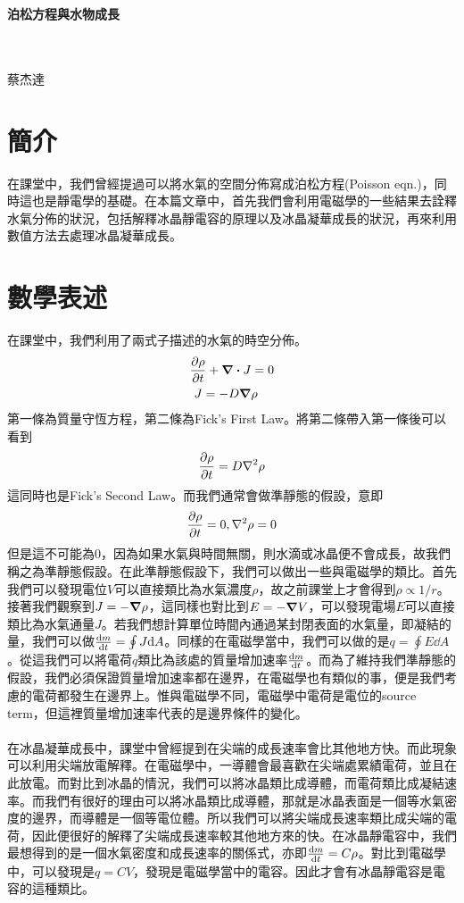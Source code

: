 \documentclass[12pt, a4paper]{article}
\theoremstyle{mystyle}	%
\begin{document}
\renewcommand{\headrulewidth}{0.4pt}
\begin{center}
\begin{Large}
\textbf{泊松方程與水物成長}
\end{Large}
~\\
~\\
蔡杰達
\end{center}
\section{簡介}
在課堂中，我們曾經提過可以將水氣的空間分佈寫成泊松方程(Poisson eqn.)，同時這也是靜電學的基礎。在本篇文章中，首先我們會利用電磁學的一些結果去詮釋水氣分佈的狀況，包括解釋冰晶靜電容的原理以及冰晶凝華成長的狀況，再來利用數值方法去處理冰晶凝華成長。

\section{數學表述}
在課堂中，我們利用了兩式子描述的水氣的時空分佈。
\begin{align}
    \pdv{\rho}{t} + \div{J} &= 0 \\
    J = -D\gradient{&\rho}
\end{align}
第一條為質量守恆方程，第二條為Fick's First Law。將第二條帶入第一條後可以看到
\begin{equation}
    \pdv{\rho}{t} = D\laplacian{\rho}
\end{equation}
這同時也是Fick's Second Law。而我們通常會做準靜態的假設，意即
\begin{equation}
    \pdv{\rho}{t} = 0, \laplacian \rho = 0
\end{equation}
但是這不可能為0，因為如果水氣與時間無關，則水滴或冰晶便不會成長，故我們稱之為準靜態假設。在此準靜態假設下，我們可以做出一些與電磁學的類比。首先我們可以發現電位\(V\)可以直接類比為水氣濃度\(\rho\)，故之前課堂上才會得到\(\rho \propto 1/r\)。接著我們觀察到\(J = -\grad{\rho}\)，這同樣也對比到\(E = -\grad{V}\)，可以發現電場\(E\)可以直接類比為水氣通量\(J\)。若我們想計算單位時間內通過某封閉表面的水氣量，即凝結的量，我們可以做\( \dv{m}{t} = \oint J \dd A\)。同樣的在電磁學當中，我們可以做的是\(q = \oint E \dd A\)。從這我們可以將電荷\(q\)類比為該處的質量增加速率\(\dv{m}{t}\)。而為了維持我們準靜態的假設，我們必須保證質量增加速率都在邊界，在電磁學也有類似的事，便是我們考慮的電荷都發生在邊界上。惟與電磁學不同，電磁學中電荷是電位的source term，但這裡質量增加速率代表的是邊界條件的變化。\\
\\
在冰晶凝華成長中，課堂中曾經提到在尖端的成長速率會比其他地方快。而此現象可以利用尖端放電解釋。在電磁學中，一導體會最喜歡在尖端處累績電荷，並且在此放電。而對比到冰晶的情況，我們可以將冰晶類比成導體，而電荷類比成凝結速率。而我們有很好的理由可以將冰晶類比成導體，那就是冰晶表面是一個等水氣密度的邊界，而導體是一個等電位體。所以我們可以將尖端成長速率類比成尖端的電荷，因此便很好的解釋了尖端成長速率較其他地方來的快。在冰晶靜電容中，我們最想得到的是一個水氣密度和成長速率的關係式，亦即\(\dv{m}{t} = C \rho\)。對比到電磁學中，可以發現是\(q = CV\)，發現是電磁學當中的電容。因此才會有冰晶靜電容是電容的這種類比。
\end{document}
